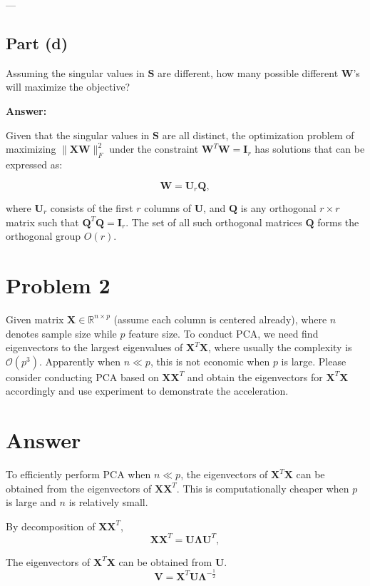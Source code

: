 \documentclass[11pt]{article}
\newcommand{\R}{\mathbb{R}}
\newcommand{\mtx}[1]{\mathbf{#1}}
\def \mU {\mtx{U}}
\def \mS {\mtx{S}}
\def \mW {\mtx{W}}
\def \mX {\mtx{X}}
\def \R {\mathbb{R}}
\begin{document}
---

\subsection*{Part (d)}
Assuming the singular values in $\mS$ are different, how many possible different $\bm{\mW}$'s will maximize the objective?

\textbf{Answer:}

Given that the singular values in \(\mathbf{S}\) are all distinct, the optimization problem of maximizing \(\|\mathbf{X} \mathbf{W}\|_F^2\) under the constraint \(\mathbf{W}^T \mathbf{W} = \mathbf{I}_r\) has solutions that can be expressed as:

\[
\mathbf{W} = \mathbf{U}_r \mathbf{Q},
\]

where \(\mathbf{U}_r\) consists of the first \(r\) columns of \(\mathbf{U}\), and \(\mathbf{Q}\) is any orthogonal \(r \times r\) matrix such that \(\mathbf{Q}^T \mathbf{Q} = \mathbf{I}_r\). The set of all such orthogonal matrices \(\mathbf{Q}\) forms the orthogonal group \(O(r)\).

\newpage

\section*{Problem 2}
	Given matrix $\mX\in\R^{n\times p}$ (assume each column is centered already), where $n$ denotes sample size while $p$ feature size. To conduct PCA, we need find eigenvectors to the  largest eigenvalues of $\mX^T\mX$, where usually the complexity is $\mathcal{O}(p^3)$. Apparently when $n\ll p$, this is not economic when $p$ is large. Please consider conducting PCA based on $\mX\mX^T$ and obtain the eigenvectors for $\mX^T\mX$ accordingly and use experiment to demonstrate the acceleration.

	\section*{Answer}

	To efficiently perform PCA when $n\ll p$, the eigenvectors of $\mX^T\mX$ can be obtained from the eigenvectors of $\mX\mX^T$. This is computationally cheaper when $p$ is large and $n$ is relatively small.
	
	By decomposition of $\mX\mX^T$,
	   \[
	   \mathbf{X}\mathbf{X}^T = \mathbf{U} \mathbf{\Lambda} \mathbf{U}^T,
	   \]
	
	The eigenvectors of $\mX^T\mX$ can be obtained from $\mU$.
		\[
		\mathbf{V} = \mathbf{X}^T \mathbf{U} \mathbf{\Lambda}^{-\frac{1}{2}}
		\]
	
\end{document}
